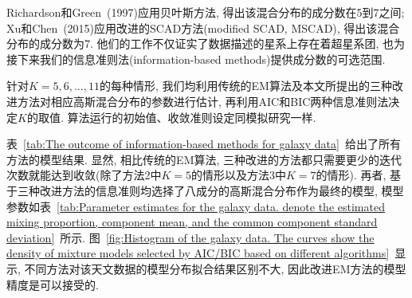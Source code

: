 \documentclass[a4paper,12pt,openany,oneside,utf-8]{ctexbook}
\begin{document}
Richardson和Green~(1997)应用贝叶斯方法, 得出该混合分布的成分数在5到7之间; Xu和Chen~(2015)应用改进的SCAD方法(modified SCAD, MSCAD), 得出该混合分布的成分数为7. 他们的工作不仅证实了数据描述的星系上存在着超星系团, 也为接下来我们的信息准则法(information-based methods)提供成分数的可选范围.

针对$K=5, 6, \ldots, 11$的每种情形, 我们均利用传统的EM算法及本文所提出的三种改进方法对相应高斯混合分布的参数进行估计, 再利用AIC和BIC两种信息准则法决定$K$的取值. 算法运行的初始值、收敛准则设定同模拟研究一样. 

表~\ref{tab:The outcome of information-based methods for galaxy data}~给出了所有方法的模型结果. 显然, 相比传统的EM算法, 三种改进的方法都只需要更少的迭代次数就能达到收敛(除了方法2中$K=5$的情形以及方法3中$K=7$的情形). 再者, 基于三种改进方法的信息准则均选择了八成分的高斯混合分布作为最终的模型, 模型参数如表~\ref{tab:Parameter estimates for the galaxy data. denote the estimated mixing proportion, component mean, and the common component standard deviation}~所示. 图~\ref{fig:Histogram of the galaxy data. The curves show the density of mixture models selected by AIC/BIC based on different algorithms}~显示, 不同方法对该天文数据的模型分布拟合结果区别不大, 因此改进EM方法的模型精度是可以接受的.
\end{document}
